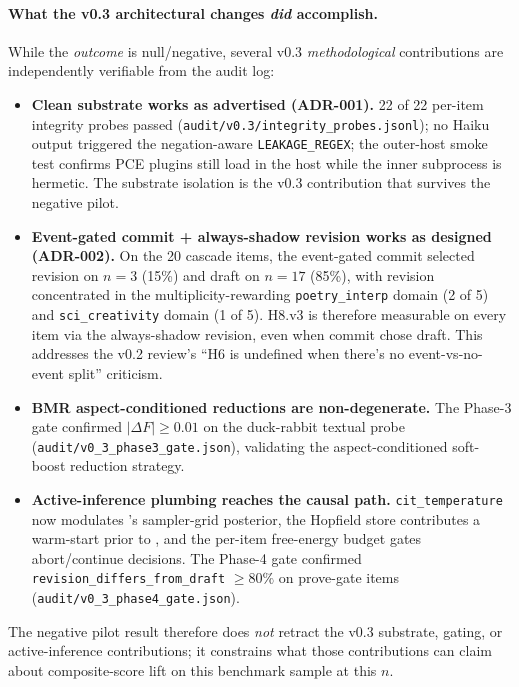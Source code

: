 \paragraph{What the v0.3 architectural changes \emph{did} accomplish.} While the \emph{outcome} is null/negative, several v0.3 \emph{methodological} contributions are independently verifiable from the audit log:
\begin{itemize}[leftmargin=1.4em]
  \item \textbf{Clean substrate works as advertised (ADR-001).} 22 of 22 per-item integrity probes passed (\texttt{audit/v0.3/integrity\_probes.jsonl}); no Haiku output triggered the negation-aware \texttt{LEAKAGE\_REGEX}; the outer-host smoke test confirms PCE plugins still load in the host while the inner subprocess is hermetic. The substrate isolation is the v0.3 contribution that survives the negative pilot.
  \item \textbf{Event-gated commit + always-shadow revision works as designed (ADR-002).} On the 20 cascade items, the event-gated commit selected revision on $n=3$ (15\%) and draft on $n=17$ (85\%), with revision concentrated in the multiplicity-rewarding \texttt{poetry\_interp} domain (2 of 5) and \texttt{sci\_creativity} domain (1 of 5). H8.v3 is therefore measurable on every item via the always-shadow revision, even when commit chose draft. This addresses the v0.2 review's ``H6 is undefined when there's no event-vs-no-event split'' criticism.
  \item \textbf{BMR aspect-conditioned reductions are non-degenerate.} The Phase-3 gate confirmed $|\Delta F| \geq 0.01$ on the duck-rabbit textual probe (\texttt{audit/v0\_3\_phase3\_gate.json}), validating the aspect-conditioned soft-boost reduction strategy.
  \item \textbf{Active-inference plumbing reaches the causal path.} \texttt{cit\_temperature} now modulates 's sampler-grid posterior, the Hopfield store contributes a warm-start prior to , and the per-item free-energy budget gates abort/continue decisions. The Phase-4 gate confirmed \texttt{revision\_differs\_from\_draft} $\geq 80\%$ on prove-gate items (\texttt{audit/v0\_3\_phase4\_gate.json}).
\end{itemize}
The negative pilot result therefore does \emph{not} retract the v0.3 substrate, gating, or active-inference contributions; it constrains what those contributions can claim about composite-score lift on this benchmark sample at this $n$.

